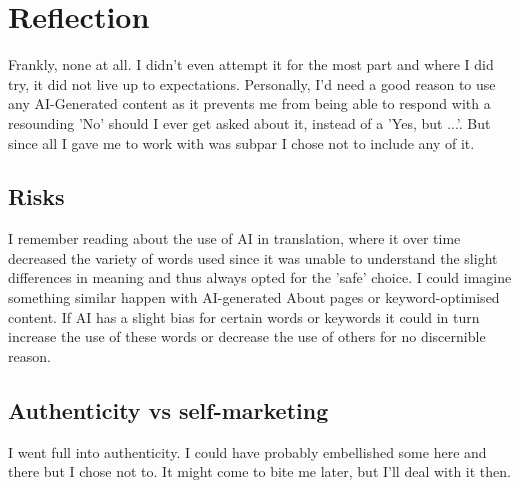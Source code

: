 \documentclass{article}
\begin{document}
	\section{Reflection}
	Frankly, none at all. I didn't even attempt it for the most part and where I did try, it did not live up to expectations. Personally, I'd need a good reason to use any AI-Generated content as it prevents me from being able to respond with a resounding 'No' should I ever get asked about it, instead of a 'Yes, but ...'. But since all I gave me to work with was subpar I chose not to include any of it.
	\subsection{Risks}
	I remember reading about the use of AI in translation, where it over time decreased the variety of words used since it was unable to understand the slight differences in meaning and thus always opted for the 'safe' choice. I could imagine something similar happen with AI-generated About pages or keyword-optimised content. If AI has a slight bias for certain words or keywords it could in turn increase the use of these words or decrease the use of others for no discernible reason.
	\subsection{Authenticity vs self-marketing}
	I went full into authenticity. I could have probably embellished some here and there but I chose not to. It might come to bite me later, but I'll deal with it then.
		
	























  
\end{document}
